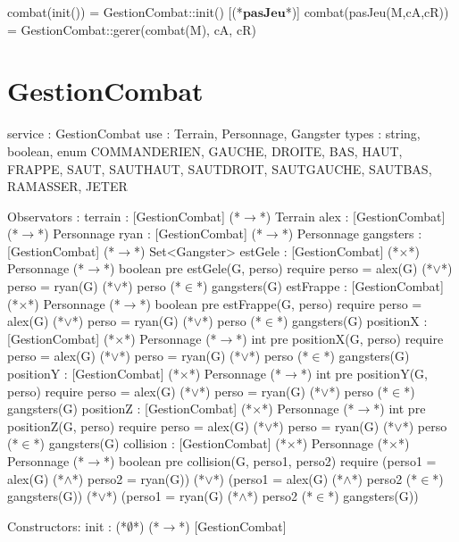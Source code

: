 \documentclass[a4paper, 11pt]{report}
\newcommand{\specB}[1]{\textbf{#1}}
\begin{document}
\begin{Spe}
      [(*$\specB{init}$*)]
          combat(init()) = GestionCombat::init()
      [(*$\specB{pasJeu}$*)]
          combat(pasJeu(M,cA,cR)) = GestionCombat::gerer(combat(M), cA, cR)
            
\end{Spe}

\section{GestionCombat}
\begin{Spe}
service : GestionCombat
use : Terrain, Personnage, Gangster  
types : string, boolean, enum COMMANDE{RIEN, GAUCHE, DROITE, BAS, HAUT, FRAPPE, SAUT, SAUTHAUT, SAUTDROIT, SAUTGAUCHE, SAUTBAS,  RAMASSER, JETER}

Observators :
      terrain : [GestionCombat] (*$\rightarrow$*) Terrain
      alex : [GestionCombat] (*$\rightarrow$*) Personnage
      ryan : [GestionCombat] (*$\rightarrow$*) Personnage
      gangsters :  [GestionCombat] (*$\rightarrow$*) Set<Gangster>
      estGele : [GestionCombat] (*$\times$*) Personnage (*$\rightarrow$*) boolean 
            pre estGele(G, perso) require perso = alex(G) (*$\lor$*) perso = ryan(G)  (*$\lor$*) perso (*$\in$*) gangsters(G)
      estFrappe : [GestionCombat] (*$\times$*) Personnage (*$\rightarrow$*) boolean 
            pre estFrappe(G, perso) require perso = alex(G) (*$\lor$*) perso = ryan(G)  (*$\lor$*) perso (*$\in$*) gangsters(G)
      positionX : [GestionCombat] (*$\times$*) Personnage (*$\rightarrow$*) int
            pre positionX(G, perso) require perso = alex(G) (*$\lor$*) perso = ryan(G)  (*$\lor$*) perso (*$\in$*) gangsters(G)
      positionY : [GestionCombat] (*$\times$*) Personnage (*$\rightarrow$*) int 
            pre positionY(G, perso) require perso = alex(G) (*$\lor$*) perso = ryan(G)  (*$\lor$*) perso (*$\in$*) gangsters(G)
      positionZ : [GestionCombat] (*$\times$*) Personnage (*$\rightarrow$*) int
            pre positionZ(G, perso) require perso = alex(G) (*$\lor$*) perso = ryan(G)  (*$\lor$*) perso (*$\in$*) gangsters(G)
      collision : [GestionCombat] (*$\times$*) Personnage (*$\times$*) Personnage (*$\rightarrow$*) boolean
            pre collision(G, perso1, perso2) require 
            (perso1 = alex(G) (*$\land$*) perso2 = ryan(G))
            (*$\lor$*) (perso1 = alex(G) (*$\land$*) perso2 (*$\in$*) gangsters(G))
            (*$\lor$*) (perso1 = ryan(G) (*$\land$*) perso2 (*$\in$*) gangsters(G))

Constructors:
      init : (*$\emptyset$*) (*$\rightarrow$*) [GestionCombat]
      

\end{Spe}
\end{document}
